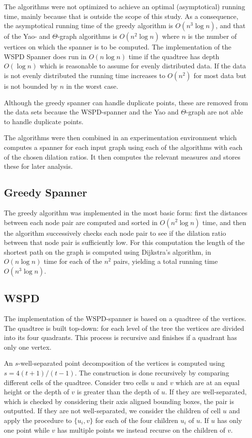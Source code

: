 \documentclass[a4paper,twoside,11pt,hidelinks]{article}
\theoremstyle{plain}
\theoremstyle{definition}  %
\begin{document}
The algorithms were not optimized to achieve an optimal (asymptotical) running time, mainly because that is outside the scope of this study. As a consequence, the asymptotical running time of the greedy algorithm is $O(n^3 \log n)$, and that of the Yao- and $\Theta$-graph algorithms is $O(n^2 \log n)$ where $n$ is the number of vertices on which the spanner is to be computed. The implementation of the WSPD Spanner does run in $O(n \log n)$ time if the quadtree has depth $O(\log n)$ which is reasonable to assume for evenly distributed data. If the data is not evenly distributed the running time increases to $O(n^2)$ for most data but is not bounded by $n$ in the worst case.

Although the greedy spanner can handle duplicate points, these are removed from the data sets because the WSPD-spanner and the Yao and $\Theta$-graph are not able to handle duplicate points.

The algorithms were then combined in an experimentation environment which computes a spanner for each input graph using each of the algorithms with each of the chosen dilation ratios. It then computes the relevant measures and stores these for later analysis.

\subsection{Greedy Spanner}

The greedy algorithm was implemented in the most basic form: first the distances
between each node pair are computed and sorted in $O(n^2 \log n)$ time, and then
the algorithm successively checks each node pair to see if the dilation ratio between that node pair is sufficiently low. For this computation the length of the shortest path on the graph is computed using Dijkstra's algorithm, in $O(n \log n)$ time for each of the $n^2$ pairs, yielding a total running time $O(n^3 \log n )$.

\subsection{WSPD}

The implementation of the WSPD-spanner is based on a quadtree of the vertices. The quadtree is built top-down: for each level of the tree the vertices are divided into its four quadrants. This process is recursive and finishes if a quadrant has only one vertex.

An $s$-well-separated point decomposition of the vertices is computed using $s=4(t+1)/(t-1)$. The construction is done recursively by comparing different cells of the quadtree. Consider two cells $u$ and $v$ which are at an equal height or the depth of $v$ is greater than the depth of $u$. If they are well-separated, which is checked by considering their axis aligned bounding boxes, the pair is outputted. If they are not well-separated, we consider the children of cell $u$ and apply the procedure to $\{u_i,v\}$ for each of the four children $u_i$ of $u$. If $u$ has only one point while $v$ has multiple points we instead recurse on the children of $v$.
\end{document}
